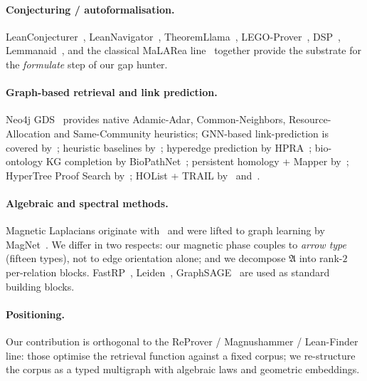 \documentclass[11pt]{article}
\newcommand{\magA}{\mathfrak{A}}
\begin{document}
\paragraph{Conjecturing / autoformalisation.}
LeanConjecturer~\citep{isomoto2025leanconjecturer},
LeanNavigator~\citep{leannavigator2025},
TheoremLlama~\citep{theoremllama2024},
LEGO-Prover~\citep{legoprover2023},
DSP~\citep{jiang2023dsp},
Lemmanaid~\citep{lemmanaid2025},
and the classical MaLARea line~\citep{urban2007malarea} together provide
the substrate for the \emph{formulate} step of our gap hunter.

\paragraph{Graph-based retrieval and link prediction.}
Neo4j GDS~\citep{neo4jgds} provides native Adamic-Adar, Common-Neighbors,
Resource-Allocation and Same-Community heuristics; GNN-based
link-prediction is covered by~\citet{gnn_link_prediction_2024};
heuristic baselines by~\citet{hal2024linkpred}; hyperedge prediction by
HPRA~\citep{kumar2020hpra}; bio-ontology KG completion by
BioPathNet~\citep{biopathnet2025}; persistent homology + Mapper
by~\citet{cohensteiner2007stability,mapper2025}; HyperTree Proof Search
by~\citet{lample2022htps}; HOList + TRAIL by~\citet{bansal2019holist}
and~\citet{trail2021}.

\paragraph{Algebraic and spectral methods.}
Magnetic Laplacians originate with~\citet{liebloss1993magnetic} and were
lifted to graph learning by MagNet~\citep{zhang2021magnet}. We differ in
two respects: our magnetic phase couples to \emph{arrow type} (fifteen
types), not to edge orientation alone; and we decompose $\magA$ into
rank-$2$ per-relation blocks. FastRP~\citep{chen2019fastrp},
Leiden~\citep{traag2019leiden}, GraphSAGE~\citep{hamilton2017graphsage}
are used as standard building blocks.

\paragraph{Positioning.}
Our contribution is orthogonal to the ReProver / Magnushammer /
Lean-Finder line: those optimise the retrieval function against a fixed
corpus; we re-structure the corpus as a typed multigraph with algebraic
laws and geometric embeddings.

\end{document}

